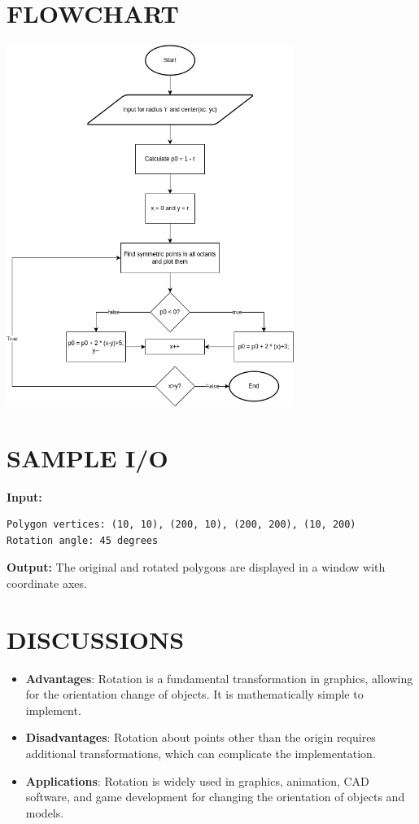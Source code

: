 \documentclass{article}
\begin{document}
\section*{FLOWCHART}
\begin{center}
\includegraphics[width=0.7\textwidth]{flowchart.png}
\end{center}

\section*{SAMPLE I/O}
\textbf{Input:}
\begin{verbatim}
Polygon vertices: (10, 10), (200, 10), (200, 200), (10, 200)
Rotation angle: 45 degrees
\end{verbatim}

\textbf{Output:}
The original and rotated polygons are displayed in a window with coordinate axes.

\section*{DISCUSSIONS}
\begin{itemize}
    \item \textbf{Advantages}: Rotation is a fundamental transformation in graphics, allowing for the orientation change of objects. It is mathematically simple to implement.
    \item \textbf{Disadvantages}: Rotation about points other than the origin requires additional transformations, which can complicate the implementation.
    \item \textbf{Applications}: Rotation is widely used in graphics, animation, CAD software, and game development for changing the orientation of objects and models.
\end{itemize}
\end{document}
